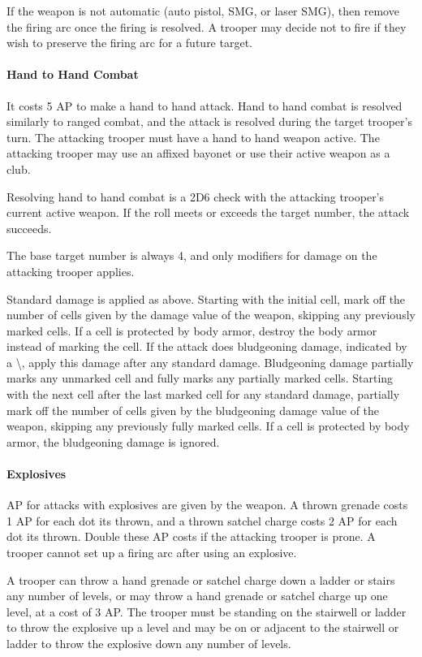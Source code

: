 If the weapon is not automatic (auto pistol, SMG, or laser SMG), then remove the firing arc once the firing is resolved.
A trooper may decide not to fire if they wish to preserve the firing arc for a future target.

\paragraph*{Hand to Hand Combat}

It costs 5 AP to make a hand to hand attack.
Hand to hand combat is resolved similarly to ranged combat, and the attack is resolved during the target trooper's turn.
The attacking trooper must have a hand to hand weapon active.
The attacking trooper may use an affixed bayonet or use their active weapon as a club.

Resolving hand to hand combat is a 2D6 check with the attacking trooper's current active weapon.
If the roll meets or exceeds the target number, the attack succeeds.

The base target number is always 4, and only modifiers for damage on the attacking trooper applies.

Standard damage is applied as above.
Starting with the initial cell, mark off the number of cells given by the damage value of the weapon, skipping any previously marked cells.
If a cell is protected by body armor, destroy the body armor instead of marking the cell.
If the attack does bludgeoning damage, indicated by a \textbackslash, apply this damage after any standard damage.
Bludgeoning damage partially marks any unmarked cell and fully marks any partially marked cells.
Starting with the next cell after the last marked cell for any standard damage, partially mark off the number of cells given by the bludgeoning damage value of the weapon, skipping any previously fully marked cells.
If a cell is protected by body armor, the bludgeoning damage is ignored.

\paragraph*{Explosives}

AP for attacks with explosives are given by the weapon.
A thrown grenade costs 1 AP for each dot its thrown, and a thrown satchel charge costs 2 AP for each dot its thrown.
Double these AP costs if the attacking trooper is prone.
A trooper cannot set up a firing arc after using an explosive.

A trooper can throw a hand grenade or satchel charge down a ladder or stairs any number of levels, or may throw a hand grenade or satchel charge up one level, at a cost of 3 AP.
The trooper must be standing on the stairwell or ladder to throw the explosive up a level and may be on or adjacent to the stairwell or ladder to throw the explosive down any number of levels.

